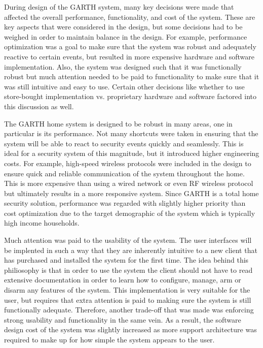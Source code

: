 \documentclass{report}
\begin{document}
During design of the GARTH system, many key decisions were made that affected
the overall performance, functionality, and cost of the system. These are key
aspects that were considered in the design, but some decisions had to be
weighed in order to maintain balance in the design. For example, performance
optimization was a goal to make sure that the system was robust and adequately
reactive to certain events, but resulted in more expensive hardware and
software implementation. Also, the system was designed such that it was
functionally robust but much attention needed to be paid to functionality to
make sure that it was still intuitive and easy to use. Certain other decisions
like whether to use store-bought implementation vs. proprietary hardware and
software factored into this discussion as well.

The GARTH home system is designed to be robust in many areas, one in particular
is its performance. Not many shortcuts were taken in ensuring that the system
will be able to react to security events quickly and seamlessly. This is ideal
for a security system of this magnitude, but it introduced higher engineering
costs. For example, high-speed wireless protocols were included in the design
to ensure quick and reliable communication of the system throughout the home.
This is more expensive than using a wired network or even RF wireless protocol
but ultimately results in a more responsive system. Since GARTH is a total home
security solution, performance was regarded with slightly higher priority than
cost optimization due to the target demographic of the system which is
typically high income households.

Much attention was paid to the usability of the system. The user interfaces
will be implented in such a way that they are inherently intuitive to a new
client that has purchased and installed the system for the first time. The idea
behind this philiosophy is that in order to use the system the client should
not have to read extensive documentation in order to learn how to configure,
manage, arm or disarm any features of the system. This implementation is very
suitable for the user, but requires that extra attention is paid to making sure
the system is still functionally adequate. Therefore, another trade-off that
was made was enforcing strong usability and functionality in the same vein. As
a result, the software design cost of the system was slightly increased as more
support architecture was required to make up for how simple the system appears
to the user.
\end{document}
